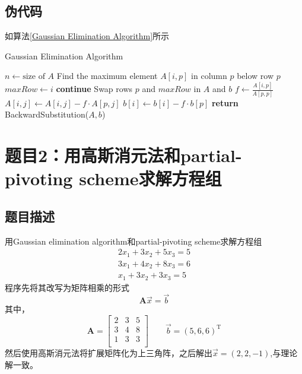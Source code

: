\documentclass[11pt]{article}
\begin{document}
\subsection{伪代码}
如算法\ref{Gaussian Elimination Algorithm}所示
\begin{algorithm}
\caption{Gaussian Elimination Algorithm}
\label{Gaussian Elimination Algorithm}
\begin{algorithmic}[1]
    \State $n \gets \text{size of } A$
        \State Find the maximum element $A[i,p]$ in column $p$ below row $p$
        \State $maxRow \gets i$
            \State \textbf{continue}
        \EndIf
        \State Swap rows $p$ and $maxRow$ in $A$ and $b$
            \State $f \gets \frac{A[i,p]}{A[p,p]}$
                \State $A[i,j] \gets A[i,j] - f \cdot A[p,j]$
            \EndFor
            \State $b[i] \gets b[i] - f \cdot b[p]$
        \EndFor
    \EndFor
    \State \textbf{return} BackwardSubstitution($A, b$)
\EndProcedure
\end{algorithmic}
\end{algorithm}

\section{题目2：用高斯消元法和partial-pivoting scheme求解方程组}
\subsection{题目描述}
用Gaussian elimination algorithm和partial-pivoting scheme求解方程组
\begin{equation}
    \begin{gathered}
2 x_{1}+3 x_{2}+5 x_{3}= \text{5} \\
3 x_{1}+4 x_{2}+8 x_{3}= \text{6} \\
  x_{1}+3  x_{2}+3  x_{3} = \text{5} 
\end{gathered}
\end{equation}
程序先将其改写为矩阵相乘的形式
\begin{equation}
    \mathbf{A}\vec{x} = \vec{b}
\end{equation}
其中，
\begin{equation}
    \mathbf{A} = \left[
\begin{matrix}
2 & 3 & 5 \\
3 & 4 & 8 \\
1 & 3 & 3 \\

\end{matrix}
\right] \qquad 
\vec{b} = (5,6,6)^{\text{T}}
\end{equation}
然后使用高斯消元法将扩展矩阵化为上三角阵，之后解出$\vec{x}=(2,2,-1)$,与理论解一致。
\end{document}
